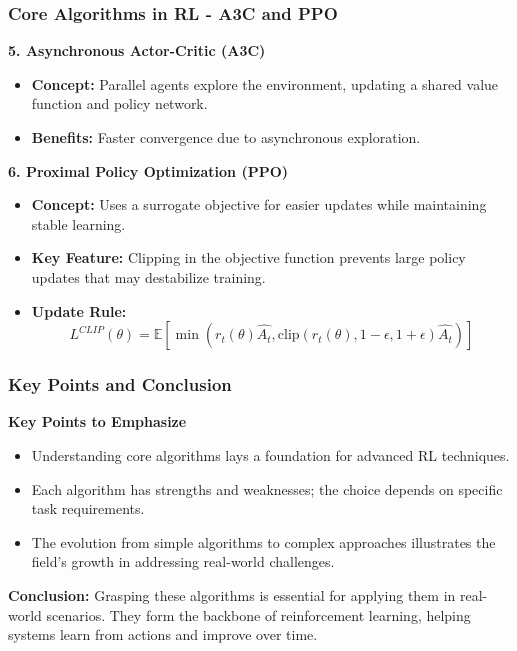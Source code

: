 \documentclass{beamer}
\begin{document}
\begin{frame}[fragile]
    \frametitle{Core Algorithms in RL - A3C and PPO}
    \textbf{5. Asynchronous Actor-Critic (A3C)}
    \begin{itemize}
        \item \textbf{Concept:} Parallel agents explore the environment, updating a shared value function and policy network.
        \item \textbf{Benefits:} Faster convergence due to asynchronous exploration.
    \end{itemize}

    \textbf{6. Proximal Policy Optimization (PPO)}
    \begin{itemize}
        \item \textbf{Concept:} Uses a surrogate objective for easier updates while maintaining stable learning.
        \item \textbf{Key Feature:} Clipping in the objective function prevents large policy updates that may destabilize training.
        \item \textbf{Update Rule:}
        \begin{equation}
            L^{CLIP}(\theta) = \mathbb{E} \left[ \min \left( r_t(\theta) \hat{A_t}, \text{clip}(r_t(\theta), 1 - \epsilon, 1 + \epsilon) \hat{A_t} \right) \right]
        \end{equation}
    \end{itemize}
\end{frame}

\begin{frame}[fragile]
    \frametitle{Key Points and Conclusion}
    \textbf{Key Points to Emphasize}
    \begin{itemize}
        \item Understanding core algorithms lays a foundation for advanced RL techniques.
        \item Each algorithm has strengths and weaknesses; the choice depends on specific task requirements.
        \item The evolution from simple algorithms to complex approaches illustrates the field's growth in addressing real-world challenges.
    \end{itemize}

    \textbf{Conclusion:}
    Grasping these algorithms is essential for applying them in real-world scenarios. They form the backbone of reinforcement learning, helping systems learn from actions and improve over time.
\end{frame}
\end{document}
